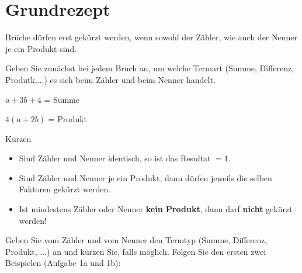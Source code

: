 

\renewcommand{\bbwAufgabenBlockID}{A1wBk}%

\usepackage{amssymb} %
\renewcommand{\metaHeaderLine}{Arbeitsblatt}
\renewcommand{\arbeitsblattTitel}{Wann Brüche kürzen?}

\arbeitsblattHeader{}
\section{Grundrezept}

Brüche dürfen erst gekürzt werden, wenn sowohl der Zähler, wie auch
der Nenner je ein Produkt sind.

Geben Sie zunächst bei jedem Bruch an, um welche Termart (Summe,
Differenz, Produtk,...) es sich beim Zähler und beim Nenner handelt.

$a+3b+4$ = Summe

$4(a+2b)$ = Produkt

\begin{rezept}{Kürzen}{}
\begin{itemize}
\item Sind Zähler und Nenner identisch, so ist das Resultat $=1$.
\item Sind Zähler und Nenner je ein Produkt, dann dürfen jeweils die
selben Faktoren gekürzt werden.
\item Ist mindestens Zähler oder Nenner \textbf{kein Produkt}, dann
darf \textbf{nicht} gekürzt werden!
\end{itemize}
\end{rezept}

Geben Sie vom Zähler und vom Nenner den Termtyp (Summe, Differenz,
Produkt, ...) an und kürzen Sie, falls möglich. Folgen Sie den ersten
zwei Beispielen (Aufgabe 1a und 1b):

